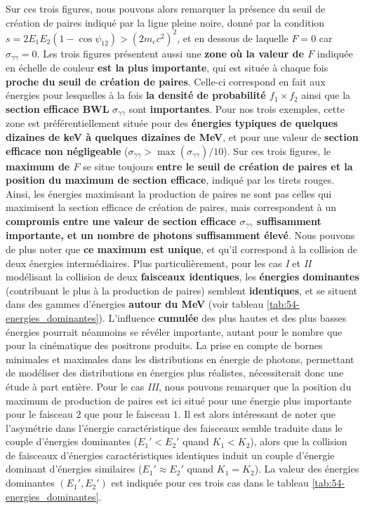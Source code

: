 \begin{refsection}
Sur ces trois figures, nous pouvons alors remarquer la présence du seuil de création de paires indiqué par la ligne pleine noire, donné par la condition $s=2 E_1 E_2(1-\cos\psi_{12})>(2 m_e c^2)^2$, et en dessous de laquelle $F=0$ car $\sigma_{\gamma\gamma}=0$. Les trois figures présentent aussi une \textbf{zone où la valeur de $F$} indiquée en échelle de couleur \textbf{est la plus importante}, qui est située à chaque fois \textbf{proche du seuil de création de paires}. Celle-ci correspond en fait aux énergies pour lesquelles à la fois \textbf{la densité de probabilité $f_1 \times f_2$} ainsi que la \textbf{section efficace BWL} $\sigma_{\gamma\gamma}$ sont \textbf{importantes}. Pour nos trois exemples, cette zone est préférentiellement située pour des \textbf{énergies typiques de quelques dizaines de keV à quelques dizaines de MeV}, et pour une valeur de \textbf{section efficace non négligeable} ($\sigma_{\gamma\gamma}>\max(\sigma_{\gamma\gamma})/10$). Sur ces trois figures, le \textbf{maximum de $F$} se situe toujours \textbf{entre le seuil de création de paires et la position du maximum de section efficace}, indiqué par les tirets rouges. Ainsi, les énergies maximisant la production de paires ne sont pas celles qui maximisent la section efficace de création de paires, mais correspondent à un \textbf{compromis entre une valeur de section efficace $\sigma_{\gamma\gamma}$ suffisamment importante, et un nombre de photons suffisamment élevé}. Nous pouvons de plus noter que \textbf{ce maximum est unique}, et qu'il correspond à la collision de deux énergies intermédiaires. Plus particulièrement, pour les cas \textit{I} et \textit{II} modélisant la collision de deux \textbf{faisceaux identiques}, les \textbf{énergies dominantes} (contribuant le plus à la production de paires) semblent \textbf{identiques}, et se situent dans des gammes d'énergies \textbf{autour du MeV} (voir tableau \ref{tab:54-energies_dominantes}). L'influence \textbf{cumulée} des plus hautes et des plus basses énergies pourrait néanmoins se révéler importante, autant pour le nombre que pour la cinématique des positrons produits. La prise en compte de bornes minimales et maximales dans les distributions en énergie de photons, permettant de modéliser des distributions en énergies plus réalistes, nécessiterait donc une étude à part entière. Pour le cas \textit{III}, nous pouvons remarquer que la position du maximum de production de paires est ici situé pour une énergie plus importante pour le faisceau $2$ que pour le faisceau $1$. Il est alors intéressant de noter que l'asymétrie dans l'énergie caractéristique des faisceaux semble traduite dans le couple d'énergies dominantes ($E_1'<E_2'$ quand $K_1<K_2$), alors que la collision de faisceaux d'énergies caractéristiques identiques induit un couple d'énergie dominant d'énergies similaires ($E_1' \approx E_2'$ quand $K_1=K_2$). La valeur des énergies dominantes $(E_1', E_2')$ est indiquée pour ces trois cas dans le tableau \ref{tab:54-energies_dominantes}.


\end{refsection}
